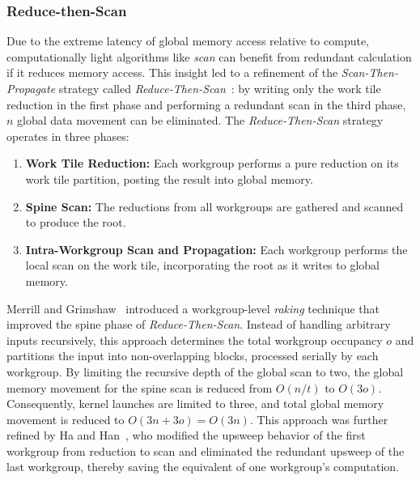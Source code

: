 \documentclass[sigconf]{acmart}
\begin{document}
\subsubsection{Reduce-then-Scan}
Due to the extreme latency of global memory access relative to compute, computationally light algorithms like \emph{scan} can benefit from redundant calculation if it reduces memory access. This insight led to a refinement of the \emph{Scan-Then-Propagate} strategy called \emph{Reduce-Then-Scan}~\cite{Merrill-Grimshaw, Ha-and-Han, Dotsenko, Breitbart}: by writing only the work tile reduction in the first phase and performing a redundant scan in the third phase, $n$ global data movement can be eliminated. The \emph{Reduce-Then-Scan} strategy operates in three phases:
\begin{enumerate}
  \item \textbf{Work Tile Reduction:} Each workgroup performs a pure reduction on its work tile partition, posting the result into global memory.
  \item \textbf{Spine Scan:} The reductions from all workgroups are gathered and scanned to produce the root.
  \item \textbf{Intra-Workgroup Scan and Propagation:} Each workgroup performs the local scan on the work tile, incorporating the root as it writes to global memory.
\end{enumerate}
Merrill and Grimshaw~\cite{} introduced a workgroup-level \emph{raking} technique that improved the spine phase of \emph{Reduce-Then-Scan}. Instead of handling arbitrary inputs recursively, this approach determines the total workgroup occupancy $o$ and partitions the input into non-overlapping blocks, processed serially by each workgroup. By limiting the recursive depth of the global scan to two, the global memory movement for the spine scan is reduced from $O(n/t)$ to $O(3o)$. Consequently, kernel launches are limited to three, and total global memory movement is reduced to $O(3n + 3o) = O(3n)$. This approach was further refined by Ha and Han~\cite{}, who modified the upsweep behavior of the first workgroup from reduction to scan and eliminated the redundant upsweep of the last workgroup, thereby saving the equivalent of one workgroup's computation.
\end{document}
